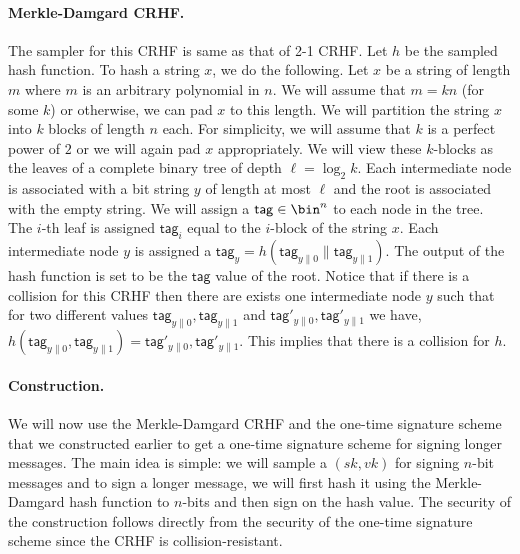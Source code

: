 \documentclass[12pt]{tufte-book}
\renewcommand{\tag}{\mathsf{tag}}
\begin{document}
\paragraph{Merkle-Damgard CRHF.} The sampler for this CRHF is same as that of 2-1 CRHF. Let $h$ be the sampled hash function. To hash a string $x$, we do the following. Let $x$ be a string of length $m$ where $m$ is an arbitrary polynomial in $n$. We will assume that $m = kn$ (for some $k$) or otherwise, we can pad $x$ to this length. We will partition  the string $x$ into $k$ blocks of length $n$ each. For simplicity, we will assume that $k$ is a perfect power of $2$ or we will again pad $x$ appropriately. We will view these $k$-blocks as the leaves of a complete binary tree of depth $\ell = \log_2 k$. Each intermediate node is associated with a bit string $y$ of length at most $\ell$ and the root is associated with the empty string. We will assign a $\tag \in \bin^n$ to each node in the tree. The $i$-th leaf is assigned $\tag_i$ equal to the $i$-block of the string $x$. Each intermediate node $y$ is assigned a $\tag_y = h(\tag_{y\|0}\| \tag_{y \| 1})$. The output of the hash function is set to be the $\tag$ value of the root. Notice that if there is a collision for this CRHF then there are exists one intermediate node $y$ such that for two different values $\tag_{y\|0},\tag_{y\|1}$ and $\tag'_{y\|0},\tag'_{y\|1}$ we have, $h(\tag_{y\|0},\tag_{y\|1}) = \tag'_{y\|0},\tag'_{y\|1}$. This implies that there is a collision for $h$. 

\paragraph{Construction.} We will now use the Merkle-Damgard CRHF and the one-time signature scheme that we constructed earlier to get a one-time signature scheme for signing longer messages. The main idea is simple: we will sample a $(sk,vk)$ for signing $n$-bit messages and to sign a longer message, we will first hash it using the Merkle-Damgard hash function to $n$-bits and then sign on the hash value. The security of the construction follows directly from the security of the one-time signature scheme since the CRHF is collision-resistant. 
\end{document}
